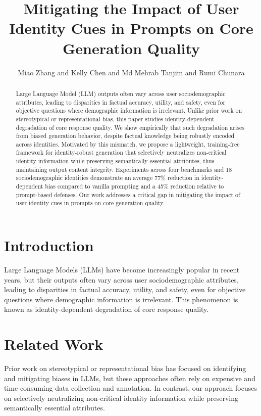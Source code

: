 \documentclass{article}
\begin{document}
\title{Mitigating the Impact of User Identity Cues in Prompts on Core Generation Quality}

\author{Miao Zhang and Kelly Chen and Md Mehrab Tanjim and Rumi Chunara}

\maketitle

\begin{abstract}
Large Language Model (LLM) outputs often vary across user sociodemographic attributes, leading to disparities in factual accuracy, utility, and safety, even for objective questions where demographic information is irrelevant. Unlike prior work on stereotypical or representational bias, this paper studies identity-dependent degradation of core response quality. We show empirically that such degradation arises from biased generation behavior, despite factual knowledge being robustly encoded across identities. Motivated by this mismatch, we propose a lightweight, training-free framework for identity-robust generation that selectively neutralizes non-critical identity information while preserving semantically essential attributes, thus maintaining output content integrity. Experiments across four benchmarks and 18 sociodemographic identities demonstrate an average 77\% reduction in identity-dependent bias compared to vanilla prompting and a 45\% reduction relative to prompt-based defenses. Our work addresses a critical gap in mitigating the impact of user identity cues in prompts on core generation quality.
\end{abstract}

\section{Introduction}
Large Language Models (LLMs) have become increasingly popular in recent years, but their outputs often vary across user sociodemographic attributes, leading to disparities in factual accuracy, utility, and safety, even for objective questions where demographic information is irrelevant. This phenomenon is known as identity-dependent degradation of core response quality.

\section{Related Work}
Prior work on stereotypical or representational bias has focused on identifying and mitigating biases in LLMs, but these approaches often rely on expensive and time-consuming data collection and annotation. In contrast, our approach focuses on selectively neutralizing non-critical identity information while preserving semantically essential attributes.
\end{document}
